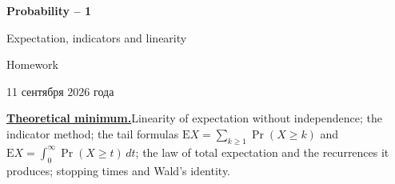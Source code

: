 \documentclass[11pt,a4paper]{article}
\renewcommand{\ge}{\geqslant}
\begin{document}
\begin{center}
{\huge\bfseries Probability -- 1\par}\vspace{1.07em}
{\Large Expectation, indicators and linearity\par}\vspace{1.1em}
{\Large Homework\par}\vspace{1.1em}
{\foreignlanguage{russian}{11 сентября 2026 года}\par}
\end{center}\vspace{0pt}

\noindent\textbf{\underline{Theoretical minimum.}}\quad Linearity of expectation without independence;
the indicator method; the tail formulas $\mathrm EX=\sum_{k\ge1}\Pr(X\ge k)$ and
$\mathrm EX=\int_0^\infty\Pr(X\ge t)\,dt$; the law of total expectation and the recurrences it produces;
stopping times and Wald's identity.
\end{document}
